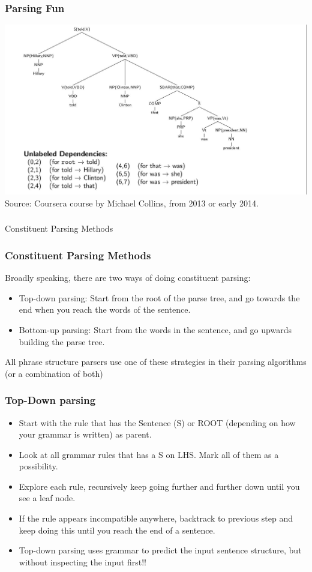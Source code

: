 \documentclass{beamer}
\begin{document}
\begin{frame}
\frametitle{Parsing Fun}
\includegraphics[width=\textwidth]{collinsparse.jpg}
\\ Source: Coursera course by Michael Collins, from 2013 or early 2014. 
\end{frame}

\begin{frame}
\frametitle{}
\Large Constituent Parsing Methods
\end{frame}

\begin{frame}
\frametitle{Constituent Parsing Methods}
 Broadly speaking, there are two ways of doing constituent parsing:
\begin{itemize}
\item Top-down parsing: Start from the root of the parse tree, and go towards the end when you reach the words of the sentence.
\item Bottom-up parsing: Start from the words in the sentence, and go upwards building the parse tree. 
\end{itemize}
All phrase structure parsers use one of these strategies in their parsing algorithms (or a combination of both)
\end{frame}

\begin{frame}
\frametitle{Top-Down parsing}
\begin{itemize}
\item Start with the rule that has the Sentence (S) or ROOT (depending on how your grammar is written) as parent.
\item Look at all grammar rules that has a S on LHS. Mark all of them as a possibility.
\item Explore each rule, recursively keep going further and further down until you see a leaf node.
\item If the rule appears incompatible anywhere, backtrack to previous step and keep doing this until you reach the end of a sentence.
\item Top-down parsing uses grammar to predict the input sentence structure, but without inspecting the input first!!
\end{itemize}
\end{frame}
\end{document}
